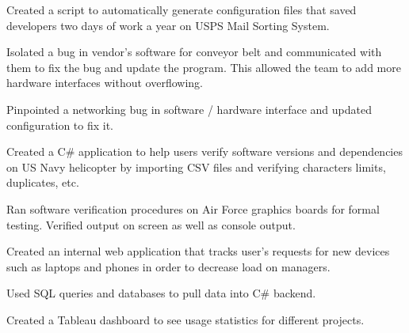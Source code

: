 \documentclass[]{deedy-resume-openfont}
\begin{document}
\sectionsep
{}\hfill {}
\begin{tightemize}
	\item Created a script to automatically generate configuration files that saved developers two days of work a year on USPS Mail Sorting System.
	\item Isolated a bug in vendor's software for conveyor belt and communicated with them to fix the bug and update the program. This allowed the team to add more hardware interfaces without overflowing. 
	\item Pinpointed a networking bug in software / hardware interface and updated configuration to fix it.
\end{tightemize}
\sectionsep
{}\hfill {}
\begin{tightemize}
	\item Created a C\# application to help users verify software versions and dependencies on US Navy helicopter by importing CSV files and verifying characters limits, duplicates, etc.
	\item Ran software verification procedures on Air Force graphics boards for formal testing. Verified output on screen as well as console output.
\end{tightemize}
\sectionsep
{}\hfill {}
\begin{tightemize}
	\item Created an internal web application that tracks user’s requests for new devices such as laptops and phones in order to decrease load on managers.
	\item Used SQL queries and databases to pull data into C\# backend.
	\item Created a Tableau dashboard to see usage statistics for different projects.
\end{tightemize}
\sectionsep
\hrulefill
%
%
\end{document}
